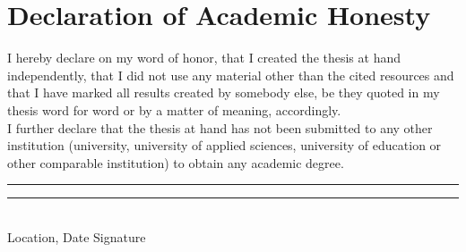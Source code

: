 \chapter*{Declaration of Academic Honesty}
I hereby declare on my word of honor, that I created the thesis at hand independently, that I did not use any material other than the cited resources and that I have marked all results created by somebody else, be they quoted in my thesis word for word or by a matter of meaning, accordingly. \\

\noindent I further declare that the thesis at hand has not been submitted to any other institution (university, university of applied sciences, university of education or other comparable institution) to obtain any academic degree.
\vspace{3cm}


\noindent \rule[1em]{15em}{0.5pt}  \hfill \rule[1em]{15em}{0.5pt}\\ %
Location, Date \hfill Signature\\


